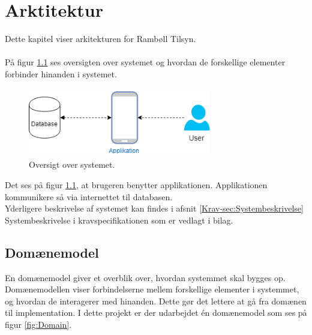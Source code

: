 \chapter{Arktitektur}
Dette kapitel viser arkitekturen for Rambøll Tilsyn. \\ \\ \label{sec:Arkitektur}
På figur \ref{fig:OversigtSystembeskrivelse} ses oversigten over systemet og hvordan de forskellige elementer forbinder hinanden i systemet.
\begin{figure}[H] %
	\centering
	\includegraphics[height=3cm, width=8cm]{../ArkitekturDesign/OverordnetArkitektur//Oversigtoversystem}
	\caption{Oversigt over systemet.}
	\label{fig:OversigtSystembeskrivelse}
\end{figure}
Det ses på figur \ref{fig:OversigtSystembeskrivelse}, at brugeren benytter applikationen. Applikationen kommunikere så via internettet til databasen. \\
Yderligere beskrivelse af systemet kan findes i afsnit \ref{Krav-sec:Systembeskrivelse} Systembeskrivelse i kravspecifikationen som er vedlagt i bilag.

\clearpage

\section{Domænemodel}
En domænemodel giver et overblik over, hvordan systemmet skal bygges op. Domænemodellen viser forbindelserne mellem forskellige elementer i systemmet, og hvordan de interagerer med hinanden. Dette gør det lettere at gå fra domænen til implementation.
I dette projekt er der udarbejdet én domænemodel som ses på figur \ref{fig:Domain}.

